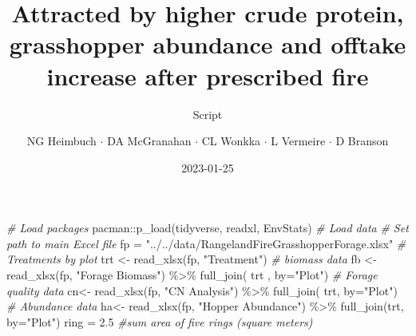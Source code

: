 \documentclass[
]{article}
\title{Attracted by higher crude protein, grasshopper abundance and
offtake increase after prescribed fire}
\subtitle{Script}
\author{NG Heimbuch \(\cdot\) DA McGranahan \(\cdot\) CL Wonkka
\(\cdot\) L Vermeire \(\cdot\) D Branson}
\date{2023-01-25}
\newenvironment{Shaded}{\begin{snugshade}}{\end{snugshade}}
\newcommand{\AttributeTok}[1]{\textcolor[rgb]{0.77,0.63,0.00}{#1}}
\newcommand{\CommentTok}[1]{\textcolor[rgb]{0.56,0.35,0.01}{\textit{#1}}}
\newcommand{\FloatTok}[1]{\textcolor[rgb]{0.00,0.00,0.81}{#1}}
\newcommand{\FunctionTok}[1]{\textcolor[rgb]{0.00,0.00,0.00}{#1}}
\newcommand{\NormalTok}[1]{#1}
\newcommand{\OtherTok}[1]{\textcolor[rgb]{0.56,0.35,0.01}{#1}}
\newcommand{\SpecialCharTok}[1]{\textcolor[rgb]{0.00,0.00,0.00}{#1}}
\newcommand{\StringTok}[1]{\textcolor[rgb]{0.31,0.60,0.02}{#1}}
\begin{document}
\maketitle

\begin{Shaded}
\begin{Highlighting}[]
\CommentTok{\# Load packages}
\NormalTok{  pacman}\SpecialCharTok{::}\FunctionTok{p\_load}\NormalTok{(tidyverse, readxl, EnvStats)}
\CommentTok{\# Load data}
  \CommentTok{\# Set path to main Excel file}
\NormalTok{    fp }\OtherTok{=} \StringTok{"../../data/RangelandFireGrasshopperForage.xlsx"}
  \CommentTok{\# Treatments by plot}
\NormalTok{    trt }\OtherTok{\textless{}{-}} \FunctionTok{read\_xlsx}\NormalTok{(fp, }\StringTok{"Treatment"}\NormalTok{)}
\CommentTok{\# biomass data}
\NormalTok{    fb }\OtherTok{\textless{}{-}} \FunctionTok{read\_xlsx}\NormalTok{(fp, }\StringTok{"Forage Biomass"}\NormalTok{) }\SpecialCharTok{\%\textgreater{}\%}
            \FunctionTok{full\_join}\NormalTok{( trt , }\AttributeTok{by=}\StringTok{"Plot"}\NormalTok{)}
\CommentTok{\# Forage quality data}
\NormalTok{    cn}\OtherTok{\textless{}{-}} \FunctionTok{read\_xlsx}\NormalTok{(fp, }\StringTok{"CN Analysis"}\NormalTok{) }\SpecialCharTok{\%\textgreater{}\%}
          \FunctionTok{full\_join}\NormalTok{( trt, }\AttributeTok{by=}\StringTok{"Plot"}\NormalTok{)}
\CommentTok{\# Abundance data}
\NormalTok{    ha}\OtherTok{\textless{}{-}} \FunctionTok{read\_xlsx}\NormalTok{(fp, }\StringTok{"Hopper Abundance"}\NormalTok{) }\SpecialCharTok{\%\textgreater{}\%}
          \FunctionTok{full\_join}\NormalTok{(trt, }\AttributeTok{by=}\StringTok{"Plot"}\NormalTok{)}
\NormalTok{  ring }\OtherTok{=} \FloatTok{2.5} \CommentTok{\#sum area of five rings (square meters)}
\end{Highlighting}
\end{Shaded}
\end{document}
